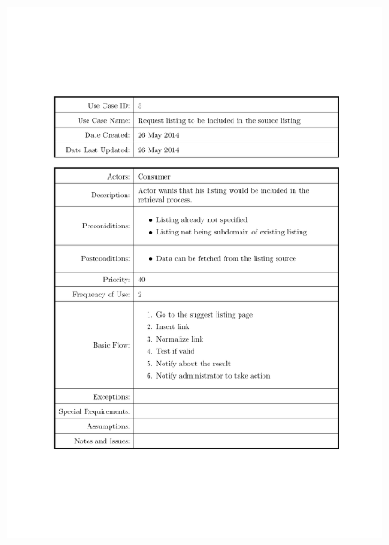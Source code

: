 \documentclass{tufte-book}
\begin{document}
\begin{figure}[h] \includegraphics[width=\linewidth]{Requirements/UseCases/005_RequestListingToBeIncluded.pdf}\end{figure}
\end{document}
